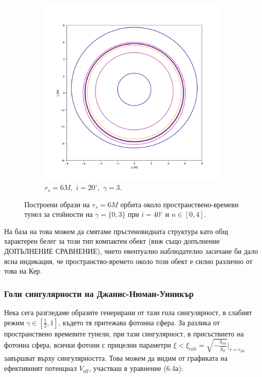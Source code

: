 \begin{figure}[!htb]
\begin{subfigure}{6cm}
		\includegraphics[scale = 0.3]{WH_20_deg_r6_gamma_3.png}
		\caption{$r_s = 6M,\,\, i = 20^\circ,\,\,\gamma = 3$.}
	\end{subfigure}
	\caption[Построени образи на $r_s = 6M$ орбита около пространствено-времеви тунел за различни стойности на $\gamma$ при $i \ 20^\circ$.]{\small Построени образи на $r_s = 6M$ орбита около пространствено-времеви тунел за стойности на $\gamma = \{0, 3\}$ при $i = 40^\circ$ и $n\in[0,4]$.} 
	\label{WH_gamma_20_deg}
\end{figure}
На база на това можем да смятаме пръстеновидната структура като общ характерен белег за този тип компактен обект (виж също допълнение ДОПЪЛНЕНИЕ СРАВНЕНИЕ), чието евентуално наблюдателно засичане би дало ясна индикация, че пространство-времето около този обект е силно различно от това на Кер.
\newpage
\subsubsection{Голи сингулярности на Джанис-Нюман-Уиникър}

Нека сега разгледаме образите генерирани от тази гола сингулярност, в слабият режим $\gamma\in\left[\frac{1}{2},1\right]$, където тя притежава фотонна сфера. За разлика от пространствено времевите тунели, при тази сингулярност, в присъствието на фотонна сфера, всички фотони с прицелни параметри $\xi <\xi_\text{crit} = \sqrt{-\frac{g_{\phi\phi}}{g_{tt}}}\big\vert_{r = r_\text{ph}}$ завършват върху сингулярността. Това можем да видим от графиката на ефективният потенциал $V_\text{eff}$, участваш в уравнение (6.4а):

